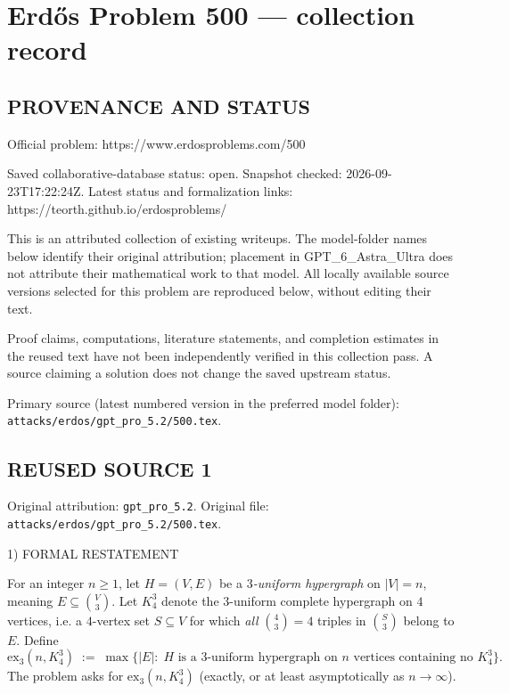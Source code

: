 \section*{Erd\H{o}s Problem 500 --- collection record}

\subsection*{PROVENANCE AND STATUS}
Official problem: https://www.erdosproblems.com/500

Saved collaborative-database status: open.
Snapshot checked: 2026-09-23T17:22:24Z.
Latest status and formalization links: https://teorth.github.io/erdosproblems/

This is an attributed collection of existing writeups. The model-folder names below identify their original attribution; placement in GPT\_6\_Astra\_Ultra does not attribute their mathematical work to that model. All locally available source versions selected for this problem are reproduced below, without editing their text.

Proof claims, computations, literature statements, and completion estimates in the reused text have not been independently verified in this collection pass. A source claiming a solution does not change the saved upstream status.

Primary source (latest numbered version in the preferred model folder): \texttt{attacks/erdos/gpt\_pro\_5.2/500.tex}.

\subsection*{REUSED SOURCE 1}
Original attribution: \texttt{gpt\_pro\_5.2}.
Original file: \texttt{attacks/erdos/gpt\_pro\_5.2/500.tex}.


1) FORMAL RESTATEMENT

For an integer $n\ge 1$, let $H=(V,E)$ be a \emph{$3$-uniform hypergraph} on $\lvert V\rvert=n$, meaning $E\subseteq \binom{V}{3}$. Let $K_4^3$ denote the $3$-uniform complete hypergraph on $4$ vertices, i.e. a $4$-vertex set $S\subseteq V$ for which \emph{all} $\binom{4}{3}=4$ triples in $\binom{S}{3}$ belong to $E$. Define
\[
\mathrm{ex}_3(n,K_4^3)\;:=\;\max\{\lvert E\rvert:\; H\text{ is a $3$-uniform hypergraph on $n$ vertices containing no }K_4^3\}.
\]
The problem asks for $\mathrm{ex}_3(n,K_4^3)$ (exactly, or at least asymptotically as $n\to\infty$).

